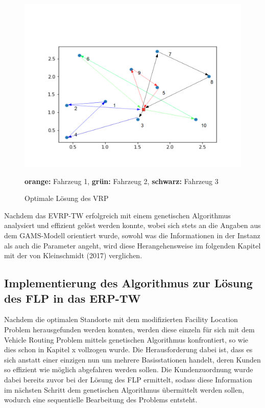 \documentclass[a4paper,12pt,parskip,bibtotoc,liststotoc]{article}
\begin{document}
\begin{figure}[h!]
  \begin{center}
    \includegraphics[width=150mm]{vrppp.png}
    \caption{Optimale Lösung des VRP}  \label{Typen}
	{\footnotesize \textbf{orange:} Fahrzeug 1, \textbf{grün:} Fahrzeug 2, \textbf{schwarz:} Fahrzeug 3}
  \end{center}
\end{figure}




\newpage


Nachdem das EVRP-TW erfolgreich mit einem genetischen Algorithmus analysiert und effizient gelöst werden konnte, wobei sich stets an die Angaben aus dem GAMS-Modell orientiert wurde, sowohl was die Informationen in der Instanz als auch die Parameter angeht, wird diese Herangehensweise im folgenden Kapitel mit der von Kleinschmidt (2017) verglichen.


\subsection{Implementierung des Algorithmus zur Lösung des FLP in das ERP-TW}


Nachdem die optimalen Standorte mit dem modifizierten Facility Location Problem herausgefunden werden konnten, werden diese einzeln für sich mit dem Vehicle Routing Problem mittels genetischen Algorithmus konfrontiert, so wie dies schon in Kapitel x vollzogen wurde.
Die Herausforderung dabei ist, dass es sich anstatt einer einzigen nun um mehrere Basisstationen handelt, deren Kunden so effizient wie möglich abgefahren werden sollen.
Die Kundenzuordnung wurde dabei bereits zuvor bei der Lösung des FLP ermittelt, sodass diese Information im nächsten Schritt dem genetischen Algorithmus übermittelt werden sollen, wodurch eine sequentielle Bearbeitung des Problems entsteht.
\end{document}
